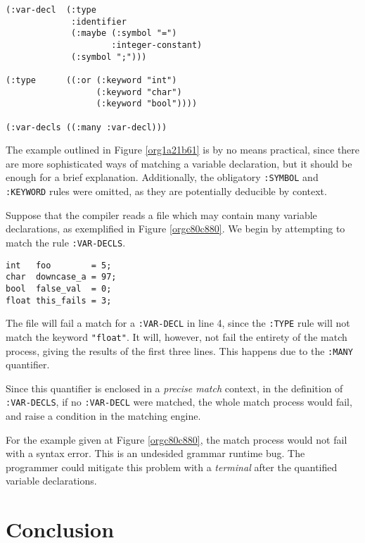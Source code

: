 \documentclass[a4paper,11pt,oneside]{article}
\begin{document}
\begin{verbatim}
(:var-decl  (:type
             :identifier
             (:maybe (:symbol "=")
                     :integer-constant)
             (:symbol ";")))

(:type      ((:or (:keyword "int")
                  (:keyword "char")
                  (:keyword "bool"))))

(:var-decls ((:many :var-decl)))
\end{verbatim}
\hfill \break

The example outlined in Figure \ref{org1a21b61} is by no means
practical, since there are more sophisticated ways of matching a
variable declaration, but it should be enough for a brief
explanation. Additionally, the obligatory \texttt{:SYMBOL} and \texttt{:KEYWORD} rules
were omitted, as they are potentially deducible by context.

Suppose that the compiler reads a file which may contain many variable
declarations, as exemplified in Figure \ref{orgc80c880}. We begin by
attempting to match the rule \texttt{:VAR-DECLS}.

\begin{verbatim}
int   foo        = 5;
char  downcase_a = 97;
bool  false_val  = 0;
float this_fails = 3;
\end{verbatim}
\hfill \break

The file will fail a match for a \texttt{:VAR-DECL} in line 4, since the \texttt{:TYPE}
rule will not match the keyword \texttt{"float"}. It will, however, not fail
the entirety of the match process, giving the results of the first
three lines. This happens due to the \texttt{:MANY} quantifier.

Since this quantifier is enclosed in a \emph{precise match} context, in the
definition of \texttt{:VAR-DECLS}, if no \texttt{:VAR-DECL} were matched, the whole
match process would fail, and raise a condition in the matching
engine.

For the example given at Figure \ref{orgc80c880}, the match process would
not fail with a syntax error. This is an undesided grammar runtime
bug. The programmer could mitigate this problem with a \emph{terminal} after
the quantified variable declarations.

\section{Conclusion}
\label{sec:orgc3ef327}
\end{document}
